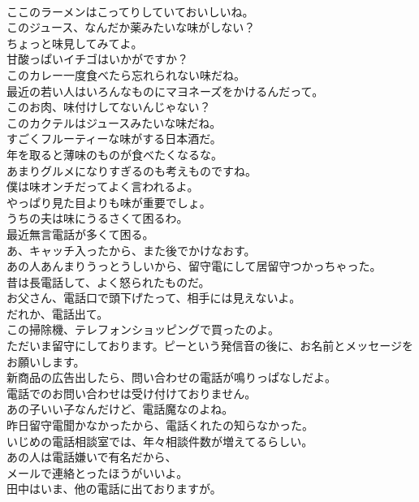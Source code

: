 \documentclass[8pt]{extreport}
\begin{document}
\begin{CJK}{UTF8}{min}
\\	ここのラーメンはこってりしていておいしいね。	
\\	このジュース、なんだか薬みたいな味がしない？	
\\	ちょっと味見してみてよ。	
\\	甘酸っぱいイチゴはいかがですか？	
\\	このカレー一度食べたら忘れられない味だね。	
\\	最近の若い人はいろんなものにマヨネーズをかけるんだって。	
\\	このお肉、味付けしてないんじゃない？	
\\	このカクテルはジュースみたいな味だね。	
\\	すごくフルーティーな味がする日本酒だ。	
\\	年を取ると薄味のものが食べたくなるな。	
\\	あまりグルメになりすぎるのも考えものですね。	
\\	僕は味オンチだってよく言われるよ。	
\\	やっぱり見た目よりも味が重要でしょ。	
\\	うちの夫は味にうるさくて困るわ。	
\\	最近無言電話が多くて困る。	
\\	あ、キャッチ入ったから、また後でかけなおす。	
\\	あの人あんまりうっとうしいから、留守電にして居留守つかっちゃった。	
\\	昔は長電話して、よく怒られたものだ。	
\\	お父さん、電話口で頭下げたって、相手には見えないよ。	
\\	だれか、電話出て。	
\\	この掃除機、テレフォンショッピングで買ったのよ。	
\\	ただいま留守にしております。ピーという発信音の後に、お名前とメッセージをお願いします。	
\\	新商品の広告出したら、問い合わせの電話が鳴りっぱなしだよ。	
\\	電話でのお問い合わせは受け付けておりません。	
\\	あの子いい子なんだけど、電話魔なのよね。	
\\	昨日留守電聞かなかったから、電話くれたの知らなかった。	
\\	いじめの電話相談室では、年々相談件数が増えてるらしい。	
\\	あの人は電話嫌いで有名だから、
\\	メールで連絡とったほうがいいよ。	
\\	田中はいま、他の電話に出ておりますが。	

\end{CJK}
\end{document}
